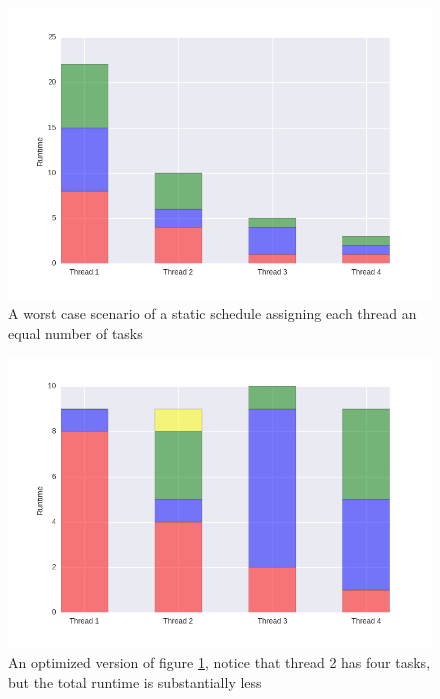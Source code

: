 
\begin{figure}
	\includegraphics[width=\textwidth]{graphics/unoptimized_schedule.png}
	\caption{A worst case scenario of a static schedule assigning each thread an equal number of tasks}
	\label{fig:unoptimized_schedule}
\end{figure}

\begin{figure}
	\includegraphics[width=\textwidth]{graphics/optimized_schedule.png}
	\caption{An optimized version of figure \ref{fig:unoptimized_schedule}, notice that thread 2 has four tasks, but the total runtime is substantially less}
	\label{fig:optimized_schedule}
\end{figure}



